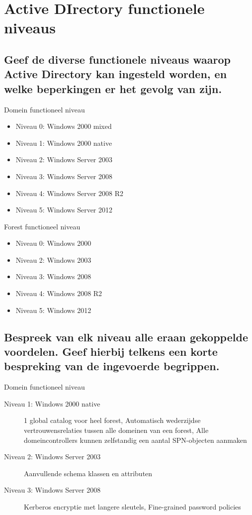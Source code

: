 \chapter{Active DIrectory functionele niveaus}

\section{Geef de diverse functionele niveaus waarop Active Directory kan
ingesteld worden, en welke beperkingen er het gevolg van zijn.}

Domein functioneel niveau
\begin{itemize}
	\item Niveau 0: Windows 2000 mixed
	\item Niveau 1: Windows 2000 native
	\item Niveau 2: Windows Server 2003
	\item Niveau 3: Windows Server 2008
	\item Niveau 4: Windows Server 2008 R2
	\item Niveau 5: Windows Server 2012
\end{itemize}

Forest functioneel niveau
\begin{itemize}
	\item Niveau 0: Windows 2000
	\item Niveau 2: Windows 2003
	\item Niveau 3: Windows 2008
	\item Niveau 4: Windows 2008 R2
	\item Niveau 5: Windows 2012
\end{itemize}

\section{Bespreek van elk niveau alle eraan gekoppelde voordelen. Geef hierbij
telkens een korte bespreking van de ingevoerde begrippen.}

Domein functioneel niveau
\begin{description}
	\item[Niveau 1: Windows 2000 native] 1 global catalog voor heel forest,
		Automatisch wederzijdse vertrouwensrelaties tussen alle domeinen
		van een forest, Alle domeincontrollers kunnen zelfstandig een
		aantal SPN-objecten aanmaken
	\item[Niveau 2: Windows Server 2003] Aanvullende schema klassen en
		attributen
	\item[Niveau 3: Windows Server 2008] Kerberos encryptie met langere
		sleutels, Fine-grained password policies
\end{description}

